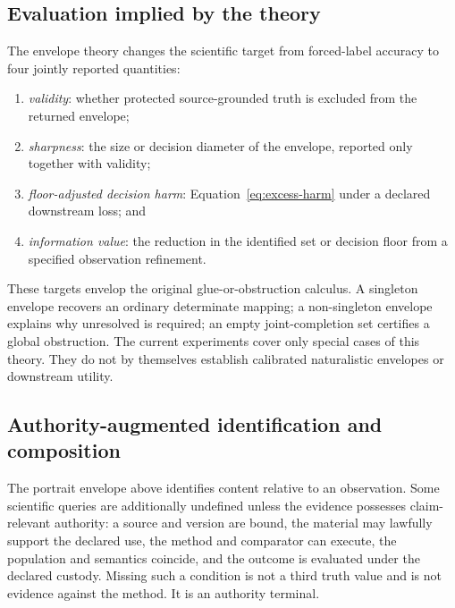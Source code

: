 \subsection{Evaluation implied by the theory}

The envelope theory changes the scientific target from forced-label accuracy
to four jointly reported quantities:
\begin{enumerate}
  \item \emph{validity}: whether protected source-grounded truth is excluded
        from the returned envelope;
  \item \emph{sharpness}: the size or decision diameter of the envelope,
        reported only together with validity;
  \item \emph{floor-adjusted decision harm}: Equation~\eqref{eq:excess-harm}
        under a declared downstream loss; and
  \item \emph{information value}: the reduction in the identified set or
        decision floor from a specified observation refinement.
\end{enumerate}
These targets envelop the original glue-or-obstruction calculus. A singleton
envelope recovers an ordinary determinate mapping; a non-singleton envelope
explains why unresolved is required; an empty joint-completion set certifies a
global obstruction. The current experiments cover only special cases of this
theory. They do not by themselves establish calibrated naturalistic envelopes
or downstream utility.

\subsection{Authority-augmented identification and composition}
\label{sec:authority-augmented}

The portrait envelope above identifies content relative to an observation.
Some scientific queries are additionally undefined unless the evidence
possesses claim-relevant authority: a source and version are bound, the
material may lawfully support the declared use, the method and comparator can
execute, the population and semantics coincide, and the outcome is evaluated
under the declared custody. Missing such a condition is not a third truth
value and is not evidence against the method. It is an authority terminal.

